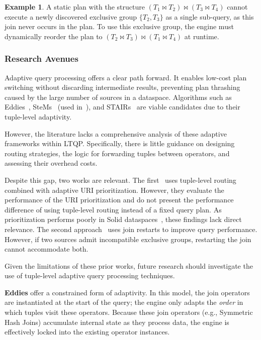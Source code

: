 \documentclass{ceurart}
\theoremstyle{definition}
\newtheorem{exmp}{Example}[section]
\begin{document}
\begin{exmp}
A static plan with the structure $(T_1 \bowtie T_2) \bowtie (T_3 \bowtie T_4)$
cannot execute a newly discovered exclusive group $\{T_2, T_3\}$ as a single sub-query, as this join never occurs in the plan.
To use this exclusive group, the engine must dynamically reorder the plan to $(T_2 \bowtie T_3) \bowtie (T_1 \bowtie T_4)$ at runtime.
\end{exmp}

\subsubsection{Research Avenues}
Adaptive query processing offers a clear path forward. 
It enables low-cost plan switching without discarding intermediate results,
preventing plan thrashing caused by the large number of sources in a dataspace.
Algorithms such as Eddies~\cite{avnur2000eddies}, SteMs~\cite{raman2003using} (used in~\cite{hartig2016walking}),
and STAIRs~\cite{deshpande2004lifting} are viable candidates due to their tuple-level adaptivity.

However, the literature lacks a comprehensive analysis of these adaptive frameworks within LTQP\@.
Specifically, there is little guidance on designing routing strategies,
the logic for forwarding tuples between operators, and assessing their overhead costs.

Despite this gap, two works are relevant. 
The first~\cite{hartig2016walking} uses tuple-level routing combined with adaptive URI prioritization.
However, they evaluate the performance of the URI prioritization and do not present the performance difference of using tuple-level routing instead
of a fixed query plan.
As prioritization performs poorly in Solid dataspaces~\cite{eschauzier2025revisiting}, these findings lack direct relevance.
The second approach~\cite{hanski2025link} uses join restarts to improve query performance.
However, if two sources admit incompatible exclusive groups, restarting the join cannot accommodate both.

Given the limitations of these prior works, future research should investigate the use of tuple-level adaptive query processing techniques.

\textbf{Eddies} offer a constrained form of adaptivity. 
In this model, the join operators are instantiated at the start of the query;
the engine only adapts the \textit{order} in which tuples visit these operators. 
Because these join operators (e.g., Symmetric Hash Joins) accumulate internal state as they process data,
the engine is effectively locked into the existing operator instances.
\end{document}

